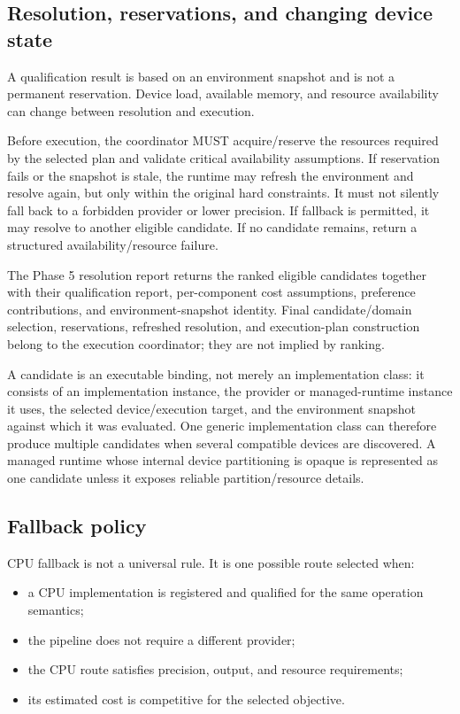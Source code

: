 \documentclass[11pt,a4paper,oneside]{article}
\begin{document}
\subsection{Resolution, reservations, and changing device state}

A qualification result is based on an environment snapshot and is not a permanent reservation. Device load, available memory, and resource availability can change between resolution and execution.

Before execution, the coordinator MUST acquire/reserve the resources required by the selected plan and validate critical availability assumptions. If reservation fails or the snapshot is stale, the runtime may refresh the environment and resolve again, but only within the original hard constraints. It must not silently fall back to a forbidden provider or lower precision. If fallback is permitted, it may resolve to another eligible candidate. If no candidate remains, return a structured availability/resource failure.

The Phase 5 resolution report returns the ranked eligible candidates together with their qualification report, per-component cost assumptions, preference contributions, and environment-snapshot identity. Final candidate/domain selection, reservations, refreshed resolution, and execution-plan construction belong to the execution coordinator; they are not implied by ranking.

A candidate is an executable binding, not merely an implementation class: it consists of an implementation instance, the provider or managed-runtime instance it uses, the selected device/execution target, and the environment snapshot against which it was evaluated. One generic implementation class can therefore produce multiple candidates when several compatible devices are discovered. A managed runtime whose internal device partitioning is opaque is represented as one candidate unless it exposes reliable partition/resource details.

\subsection{Fallback policy}

CPU fallback is not a universal rule. It is one possible route selected when:
\begin{itemize}
  \item a CPU implementation is registered and qualified for the same operation semantics;
  \item the pipeline does not require a different provider;
  \item the CPU route satisfies precision, output, and resource requirements;
  \item its estimated cost is competitive for the selected objective.
\end{itemize}
\end{document}
